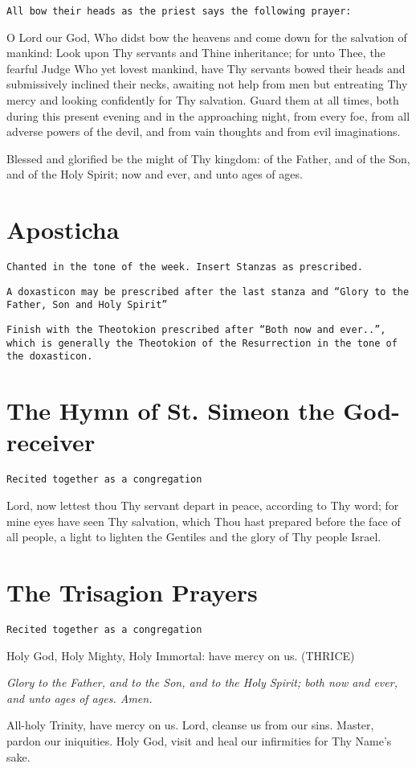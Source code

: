 \documentclass[twoside, letterpaper, 12pt]{report}
\newcommand{\instruction}[1]{%
  \texttt{\scriptsize{#1}}%
}
\newcommand{\centeredsection}[1]{%
  \needspace{10\baselineskip}%
  \section*{\centering{}#1}%
}
\begin{document}
\instruction{All bow their heads as the priest says the following prayer:}
\begin{priest}
\item O Lord our God, Who didst bow the heavens and come down for the salvation of
    mankind: Look upon Thy servants and Thine inheritance; for unto Thee, the fearful
    Judge Who yet lovest mankind, have Thy servants bowed their heads and
    submissively inclined their necks, awaiting not help from men but entreating Thy
    mercy and looking confidently for Thy salvation. Guard them at all times, both
    during this present evening and in the approaching night, from every foe, from all
    adverse powers of the devil, and from vain thoughts and from evil imaginations.
\item Blessed and glorified be the might of Thy kingdom: of the Father, and of the Son,
    and of the Holy Spirit; now and ever, and unto ages of ages.
\end{priest}


\centeredsection{Aposticha}
\instruction{Chanted in the tone of the week. Insert Stanzas as prescribed.}

\vbox{}
\instruction{A doxasticon may be prescribed after the last stanza and
``Glory to the Father, Son and Holy Spirit''}

\vbox{}
\instruction{Finish with the Theotokion prescribed after ``Both now and ever..'',
which is generally the Theotokion of the Resurrection in the tone of the doxasticon.
}

\cleardoublepage

\centeredsection{The Hymn of St. Simeon the God-receiver}
\instruction{Recited together as a congregation}

Lord, now lettest thou Thy servant depart in peace, according to Thy word; for mine eyes
have seen Thy salvation, which Thou hast prepared before the face of all people, a light to lighten
the Gentiles and the glory of Thy people Israel.

\centeredsection{The Trisagion Prayers}
\instruction{Recited together as a congregation}

Holy God, Holy Mighty, Holy Immortal: have mercy on us. (THRICE)

\vbox{}
\emph{Glory to the Father, and to the Son, and to the Holy Spirit; both now and ever, and
unto ages of ages. Amen.}

\vbox{}
All-holy Trinity, have mercy on us. Lord, cleanse us from our sins. Master, pardon
our iniquities. Holy God, visit and heal our infirmities for Thy Name’s sake.
\end{document}
